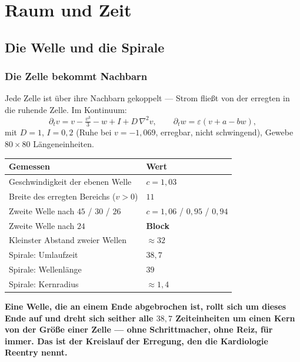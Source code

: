 \part{Raum und Zeit}

\chapter{Die Welle und die Spirale}

\section{Die Zelle bekommt Nachbarn}

\begin{merksatz}
Jede Zelle ist über ihre Nachbarn gekoppelt --- Strom fließt von der erregten in die ruhende Zelle. Im Kontinuum:
\[ \partial_t v = v - \tfrac{v^{3}}{3} - w + I + D\,\nabla^{2}v, \qquad \partial_t w = \varepsilon(v + a - bw), \]
mit $D = 1$, $I = 0{,}2$ (Ruhe bei $v = -1{,}069$, erregbar, nicht schwingend), Gewebe $80\times80$ Längeneinheiten.

\begin{center}
{\small
\renewcommand{\arraystretch}{1.46}
\begin{tabular}{@{}P{4.2cm}P{4.6cm}@{}}
\toprule
\textbf{Gemessen} & \textbf{Wert}\\
\midrule
Geschwindigkeit der ebenen Welle & $c = 1{,}03$\\
Breite des erregten Bereichs ($v > 0$) & $11$\\
Zweite Welle nach $45$ / $30$ / $26$ & $c = 1{,}06$ / $0{,}95$ / $0{,}94$\\
Zweite Welle nach $24$ & \textbf{Block}\\
Kleinster Abstand zweier Wellen & $\approx 32$\\
\midrule
Spirale: Umlaufzeit & $38{,}7$\\
Spirale: Wellenlänge & $39$\\
Spirale: Kernradius & $\approx 1{,}4$\\
\bottomrule
\end{tabular}}
\end{center}

\begin{center}
\begin{minipage}{0.9\textwidth}
\textbf{Eine Welle, die an einem Ende abgebrochen ist, rollt sich um dieses Ende auf und dreht sich seither alle $38{,}7$ Zeiteinheiten um einen Kern von der Größe einer Zelle --- ohne Schrittmacher, ohne Reiz, für immer. Das ist der Kreislauf der Erregung, den die Kardiologie Reentry nennt.}
\end{minipage}
\end{center}


\end{merksatz}
